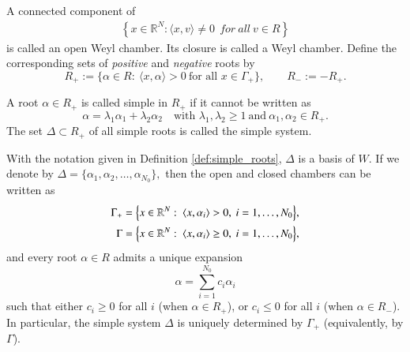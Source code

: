 \documentclass[12pt]{amsart}
\begin{document}
\begin{definition}{\rm \cite[Definition ~2.7]{HeckmanCoxeterGroups}}\label{def:weyl_chamber_positive_roots} A connected component of \begin{align}
    \left\{x\in\mathbb{R}^N:\langle x,v\rangle \neq 0\ \ { for} \ { all} \ v\in R\right\}
  \end{align} is called an open
Weyl chamber. Its closure is called a Weyl chamber.  Define the corresponding sets of \emph{positive} and \emph{negative} roots by
\[
R_{+}:=\{\alpha\in R:\ \langle x,\alpha\rangle>0\ \text{for all }x\in \Gamma_{+}\},
\qquad
R_{-}:=-R_{+}.
\]
\end{definition}

\begin{definition}{\rm \cite[Definition~2.9]{HeckmanCoxeterGroups}}\label{def:simple_roots}
A root $\alpha\in R_{+}$
is called simple in $R_{+}$ if it cannot be written as
\[
\alpha=\lambda_{1}\alpha_{1}+\lambda_{2}\alpha_{2}
\quad\text{with }\lambda_{1},\lambda_{2}\ge 1\ \text{and}\ \alpha_{1},\alpha_{2}\in R_{+}.
\]
The set $\Delta\subset R_{+}$ of all simple roots is called the
simple system.
\end{definition}

\begin{lemma}\label{lem:simple_system_associated_to_chamber}
With the notation given in Definition \ref{def:simple_roots},  $\Delta$ is a basis of $W$. If we denote by
$
\Delta=\{\alpha_{1},\alpha_{2},\ldots,\alpha_{N_{0}}\},
$
then the open and closed chambers can be written as
\begin{align}
\Gamma_{+}
&=\Bigl\{x\in\mathbb{R}^{N}:\ \langle x,\alpha_{i}\rangle>0,\ i=1,\ldots,N_{0}\Bigr\},
\label{eq:open_chamber_by_simple_roots}\\
\Gamma
&=\Bigl\{x\in\mathbb{R}^{N}:\ \langle x,\alpha_{i}\rangle\ge 0,\ i=1,\ldots,N_{0}\Bigr\},
\label{eq:closed_chamber_by_simple_roots}
\end{align}
and every root $\alpha\in R$ admits a unique expansion
\[
\alpha=\sum_{i=1}^{N_{0}}c_{i}\alpha_{i}
\]
such that either $c_{i}\ge 0$ for all $i$ (when $\alpha\in R_{+}$), or $c_{i}\le 0$ for all $i$
(when $\alpha\in R_{-}$). In particular, the simple system $\Delta$ is uniquely determined by $\Gamma_{+}$
(equivalently, by $\Gamma$).
\end{lemma}
\end{document}
